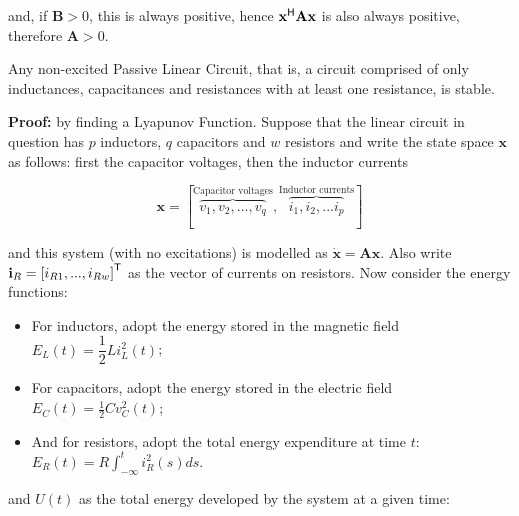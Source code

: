 	\noindent and, if $\mathbf{B} > 0$, this is always positive, hence $\mathbf{x}^{\mathsf{H}}\mathbf{Ax}$ is also always positive, therefore $\mathbf{A} > 0$.

\begin{theorem}\label{theo:plcs_stable} %
	Any non-excited Passive Linear Circuit, that is, a circuit comprised of only inductances, capacitances and resistances with at least one resistance, is stable.
\end{theorem}
\noindent\textbf{Proof:} by finding a Lyapunov Function. Suppose that the linear circuit in question has $p$ inductors, $q$ capacitors and $w$ resistors and write the state space $\mathbf{x}$ as follows: first the capacitor voltages, then the inductor currents

\begin{equation} \mathbf{x} = \left[ \overbrace{v_1,v_2,...,v_q}^{\text{Capacitor voltages}}, \overbrace{i_1, i_2 , ... i_p}^{\text{Inductor currents}}\right] \end{equation}

	\noindent and this system (with no excitations) is modelled as $\dot{\mathbf{x}} = \mathbf{Ax}$. Also write $\mathbf{i}_R = \left[i_{R1},...,i_{Rw}\right]^{\mathsf{T}}$ as the vector of currents on resistors. Now consider the energy functions:

\begin{itemize}
	\item For inductors, adopt the energy stored in the magnetic field $E_L(t) = \dfrac{1}{2} Li_L^2(t)$;
	\item For capacitors, adopt the energy stored in the electric field $E_C(t) = \frac{1}{2} Cv_C^2(t)$;
	\item And for resistors, adopt the total energy expenditure at time $t$: $E_R(t) = \displaystyle R\int_{-\infty}^t i_R^2(s)ds$.
\end{itemize}

	\noindent and $U(t)$ as the total energy developed by the system at a given time:

